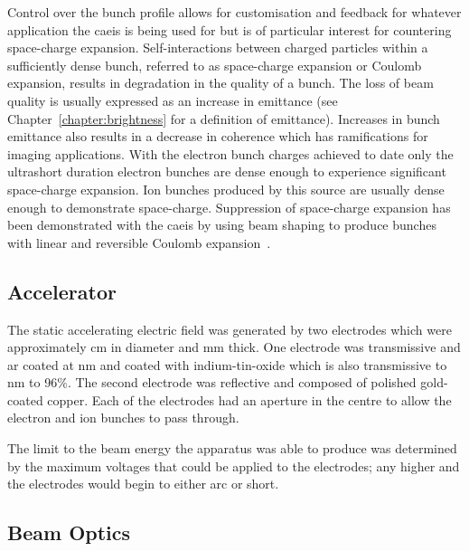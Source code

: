 Control over the bunch profile allows for customisation and feedback for whatever application the \gls{caeis} is being used for but is of particular interest for countering space-charge expansion.
Self-interactions between charged particles within a sufficiently dense bunch, referred to as space-charge expansion or Coulomb expansion, results in degradation in the quality of a bunch.
The loss of beam quality is usually expressed as an increase in emittance (see Chapter~\ref{chapter:brightness} for a definition of emittance).
Increases in bunch emittance also results in a decrease in coherence which has ramifications for imaging applications.
With the electron bunch charges achieved to date only the ultrashort duration electron bunches are dense enough to experience significant space-charge expansion.
Ion bunches produced by this source are usually dense enough to demonstrate space-charge.
Suppression of space-charge expansion has been demonstrated with the \gls{caeis} by using beam shaping to produce bunches with linear and reversible Coulomb expansion~\cite{luiten_how_2004,thompson_suppression_2016}.

\subsection{Accelerator}

The static accelerating electric field was generated by two electrodes which were approximately \unit[11]{cm} in diameter and \unit[4]{mm} thick.
One electrode was transmissive and \gls{ar} coated at \unit[780]{nm} and coated with indium-tin-oxide which is also transmissive to \unit[780]{nm} to 96\%.
The second electrode was reflective and composed of polished gold-coated copper.
Each of the electrodes had an aperture in the centre to allow the electron and ion bunches to pass through.

The limit to the beam energy the apparatus was able to produce was determined by the maximum voltages that could be applied to the electrodes; any higher and the electrodes would begin to either arc or short.

\subsection{Beam Optics}

